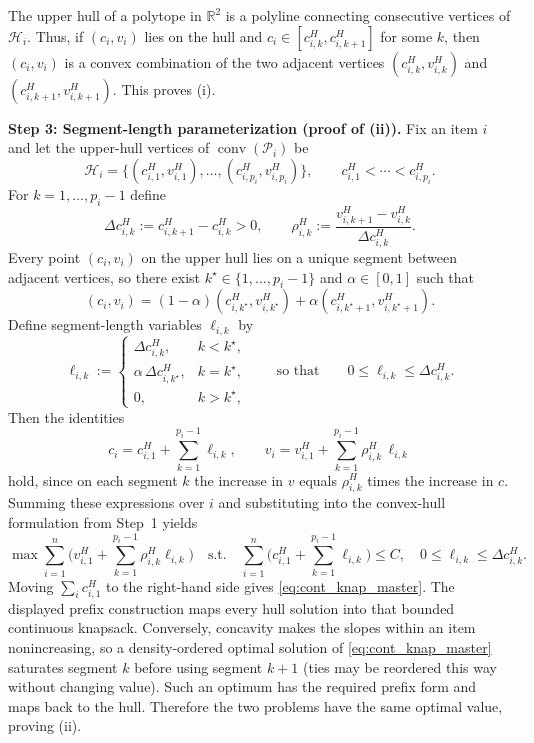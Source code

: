 \documentclass[11pt, a4paper]{article}
\theoremstyle{plain}
\theoremstyle{definition}
\theoremstyle{remark}
\begin{document}
The upper hull of a polytope in $\mathbb R^2$ is a polyline connecting consecutive vertices of $\mathcal H_i$.
Thus, if $(c_i,v_i)$ lies on the hull and $c_i\in[c^H_{i,k},c^H_{i,k+1}]$ for some $k$, then
$(c_i,v_i)$ is a convex combination of the two adjacent vertices
$(c^H_{i,k},v^H_{i,k})$ and $(c^H_{i,k+1},v^H_{i,k+1})$. This proves (i).

\textbf{Step 3: Segment-length parameterization (proof of (ii)).}
Fix an item $i$ and let the upper-hull vertices of $\operatorname{conv}(\mathcal P_i)$ be
\[
\mathcal H_i=\{(c^H_{i,1},v^H_{i,1}),\dots,(c^H_{i,p_i},v^H_{i,p_i})\},
\qquad c^H_{i,1}<\cdots<c^H_{i,p_i}.
\]
For $k=1,\dots,p_i-1$ define
\[
\Delta c^H_{i,k}:=c^H_{i,k+1}-c^H_{i,k}>0,
\qquad
\rho^H_{i,k}:=\frac{v^H_{i,k+1}-v^H_{i,k}}{\Delta c^H_{i,k}}.
\]
Every point $(c_i,v_i)$ on the upper hull lies on a unique segment between adjacent vertices, so there exist
$k^\star\in\{1,\dots,p_i-1\}$ and $\alpha\in[0,1]$ such that
\[
(c_i,v_i)=(1-\alpha)(c^H_{i,k^\star},v^H_{i,k^\star})+\alpha(c^H_{i,k^\star+1},v^H_{i,k^\star+1}).
\]
Define segment-length variables $\ell_{i,k}$ by
\[
\ell_{i,k}:=
\begin{cases}
\Delta c^H_{i,k}, & k<k^\star,\\
\alpha\,\Delta c^H_{i,k^\star}, & k=k^\star,\\
0, & k>k^\star,
\end{cases}
\qquad\text{so that}\qquad 0\le \ell_{i,k}\le \Delta c^H_{i,k}.
\]
Then the identities
\[
c_i=c^H_{i,1}+\sum_{k=1}^{p_i-1}\ell_{i,k},
\qquad
v_i=v^H_{i,1}+\sum_{k=1}^{p_i-1}\rho^H_{i,k}\,\ell_{i,k}
\]
hold, since on each segment $k$ the increase in $v$ equals $\rho^H_{i,k}$ times the increase in $c$.
Summing these expressions over $i$ and substituting into the convex-hull formulation from Step~1 yields
\[
\max \sum_{i=1}^n \Big(v^H_{i,1}+\sum_{k=1}^{p_i-1}\rho^H_{i,k}\ell_{i,k}\Big)
\quad \text{s.t.}\quad
\sum_{i=1}^n \Big(c^H_{i,1}+\sum_{k=1}^{p_i-1}\ell_{i,k}\Big)\le C,\quad
0\le \ell_{i,k}\le \Delta c^H_{i,k}.
\]
Moving $\sum_i c^H_{i,1}$ to the right-hand side gives \eqref{eq:cont_knap_master}.  The displayed prefix construction maps every hull
solution into that bounded continuous knapsack.  Conversely, concavity makes the slopes within an item nonincreasing, so a density-ordered
optimal solution of \eqref{eq:cont_knap_master} saturates segment $k$ before using segment $k+1$ (ties may be reordered this way without
changing value).  Such an optimum has the required prefix form and maps back to the hull.  Therefore the two problems have the same optimal
value, proving (ii).
\end{document}
